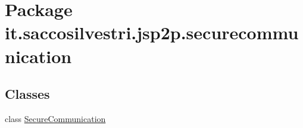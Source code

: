 \hypertarget{namespaceit_1_1saccosilvestri_1_1jsp2p_1_1securecommunication}{
\section{\-Package it.saccosilvestri.jsp2p.securecommunication}
\label{namespaceit_1_1saccosilvestri_1_1jsp2p_1_1securecommunication}
}
\subsection*{\-Classes}
\begin{DoxyCompactItemize}
\item 
class \hyperlink{classit_1_1saccosilvestri_1_1jsp2p_1_1securecommunication_1_1_secure_communication}{\-Secure\-Communication}
\end{DoxyCompactItemize}
